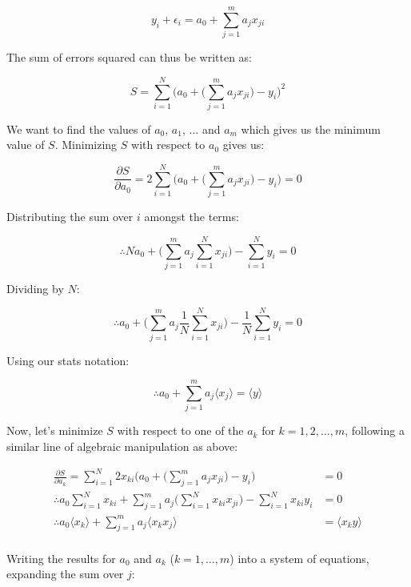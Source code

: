 \documentclass[11pt]{article}
\begin{document}
\[
y_i + \epsilon_i = a_0 + \sum_{j = 1}^m a_j x_{ji}
\]





    The sum of errors squared can thus be written as:

\[
S = \sum_{i=1}^N \bigg(a_0 + \bigg(\sum_{j=1}^m a_j x_{ji} \bigg) - y_i\bigg)^2
\]





    We want to find the values of \(a_0\), \(a_1\), \(\dots\) and \(a_m\)
which gives us the minimum value of \(S\). Minimizing \(S\) with respect
to \(a_0\) gives us:

\[
\frac{\partial S}{\partial a_0} = 2 \sum_{i=1}^N \bigg(a_0 + \bigg(\sum_{j=1}^m a_j x_{ji} \bigg) - y_i\bigg) = 0
\]

Distributing the sum over \(i\) amongst the terms:

\[
\therefore N a_0 + \bigg(\sum_{j=1}^m a_j \sum_{i=1}^N x_{ji} \bigg) - \sum_{i=1}^N y_i = 0
\]

Dividing by \(N\):

\[
\therefore a_0 + \bigg(\sum_{j=1}^m a_j \frac{1}{N}\sum_{i=1}^N x_{ji} \bigg) - \frac{1}{N}\sum_{i=1}^N y_i = 0
\]

Using our stats notation:

\[
\therefore a_0 + \sum_{j=1}^m a_j \langle{x_{j}}\rangle = \langle{y}\rangle
\]





    Now, let's minimize \(S\) with respect to one of the \(a_k\) for
\(k = 1, 2, \dots, m\), following a similar line of algebraic
manipulation as above:

\[
\begin{align*}
\frac{\partial S}{\partial a_k} = \sum_{i=1}^N 2 x_{ki} \bigg(a_0 + \bigg(\sum_{j=1}^m a_j x_{ji} \bigg) - y_i\bigg) &= 0\\
\therefore a_0 \sum_{i=1}^N x_{ki} + \sum_{j=1}^m a_j \bigg(\sum_{i=1}^N x_{ki} x_{ji} \bigg) - \sum_{i=1}^N x_{ki} y_i &= 0\\
\therefore a_0 \langle{x_{k}}\rangle + \sum_{j=1}^m a_j \langle{x_k x_j}\rangle &= \langle{x_k y}\rangle\\
\end{align*}
\]





    Writing the results for \(a_0\) and \(a_k\) (\(k = 1,\dots,m\)) into a
system of equations, expanding the sum over \(j\):
\end{document}
